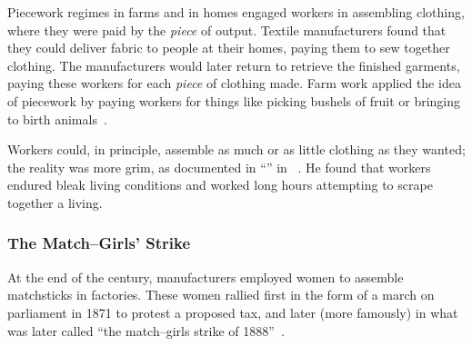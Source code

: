 \documentclass[trackingWork]{subfiles}
\begin{document}
Piecework regimes in farms and in homes engaged workers in assembling clothing, where they were paid by the \textit{piece} of output. %
Textile manufacturers found that they could deliver fabric to people at their homes,
paying them to sew together clothing.
The manufacturers would later return to retrieve the finished garments,
paying these workers for each \textit{piece} of clothing made. 
Farm work applied the idea of piecework by
paying workers for things like picking bushels of fruit or bringing to birth animals~\cite{10.2307/2338394}.

Workers could, in principle, assemble as much or as little clothing as they wanted;
the reality was more grim, as
\citeauthor{riisOtherSideLives} documented in ``'' in \citeyear{riisOtherSideLives}~\cite{riisOtherSideLives}.
He found that
workers endured bleak living conditions and
worked long hours attempting to scrape together a living.


\subsubsection{The Match--Girls' Strike}

At the end of the  century,
manufacturers employed women to assemble matchsticks in factories.
These women rallied first in the form of a march on parliament in 1871 to protest a proposed tax, and 
later (more famously) in what was later called ``the match--girls strike of 1888''~\cite{10.2307/3827491}.
\end{document}
